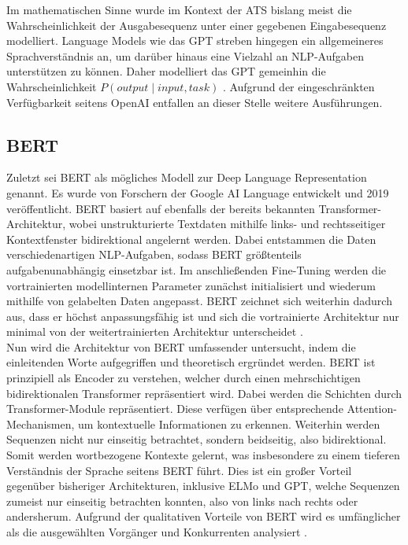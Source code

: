 \noindent
Im mathematischen Sinne wurde im Kontext der \ac{ATS} bislang meist die Wahrscheinlichkeit der Ausgabesequenz unter einer gegebenen Eingabesequenz modelliert. Language Models wie das \ac{GPT} streben hingegen ein allgemeineres Sprachverständnis an, um darüber hinaus eine Vielzahl an \ac{NLP}-Aufgaben unterstützen zu können. Daher modelliert das \ac{GPT} gemeinhin die Wahrscheinlichkeit $P(output \mid input, task)$ \cite[S.~2]{RAD19}. Aufgrund der eingeschränkten Verfügbarkeit seitens OpenAI entfallen an dieser Stelle weitere Ausführungen.


\subsection{BERT}
\noindent
Zuletzt sei \ac{BERT} als mögliches Modell zur Deep Language Representation genannt. Es wurde von Forschern der Google AI Language entwickelt und 2019 veröffentlicht. \ac{BERT} basiert auf ebenfalls der bereits bekannten Transformer-Architektur, wobei unstrukturierte Textdaten mithilfe links- und rechtsseitiger Kontextfenster bidirektional angelernt werden. Dabei entstammen die Daten verschiedenartigen \ac{NLP}-Aufgaben, sodass \ac{BERT} größtenteils aufgabenunabhängig einsetzbar ist. Im anschließenden Fine-Tuning werden die vortrainierten modellinternen Parameter zunächst initialisiert und wiederum mithilfe von gelabelten Daten angepasst. \ac{BERT} zeichnet sich weiterhin dadurch aus, dass er höchst anpassungsfähig ist und sich die vortrainierte Architektur nur minimal von der weitertrainierten Architektur unterscheidet \cite[S.~1-3]{DEV19}.\\

\noindent
Nun wird die Architektur von \ac{BERT} umfassender untersucht, indem die einleitenden Worte aufgegriffen und theoretisch ergründet werden. \ac{BERT} ist prinzipiell als Encoder zu verstehen, welcher durch einen mehrschichtigen bidirektionalen Transformer repräsentiert wird. Dabei werden die Schichten durch Transformer-Module repräsentiert. Diese verfügen über entsprechende Attention-Mechanismen, um kontextuelle Informationen zu erkennen. Weiterhin werden Sequenzen nicht nur einseitig betrachtet, sondern beidseitig, also bidirektional. Somit werden wortbezogene Kontexte gelernt, was insbesondere zu einem tieferen Verständnis der Sprache seitens \ac{BERT} führt. Dies ist ein großer Vorteil gegenüber bisheriger Architekturen, inklusive \ac{ELMo} und \ac{GPT}, welche Sequenzen zumeist nur einseitig betrachten konnten, also von links nach rechts oder andersherum. Aufgrund der qualitativen Vorteile von \ac{BERT} wird es umfänglicher als die ausgewählten Vorgänger und Konkurrenten analysiert \cite[S.~3]{DEV19}.
\newpage

